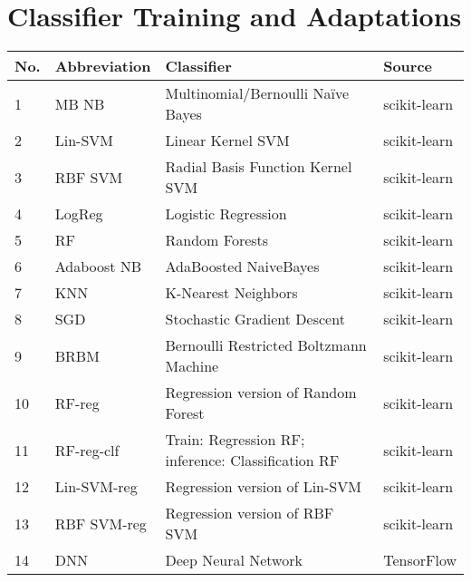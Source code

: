 \chapter{Classifier Training and Adaptations}\label{sec:ml}


\begin{table}[t]
    \centering
    \begin{tabular}{|l|l|l|l|}
    \hline\hline
    \textsf{No.}& \textsf{Abbreviation} & \textsf{Classifier} & \textsf{Source}\\
   
    \hline
    1 & \textsf{MB NB} & \textsf{Multinomial/Bernoulli Na\"{i}ve Bayes} & \textsf{scikit-learn} \\
    2 & \textsf{Lin-SVM}& \textsf{Linear Kernel SVM} & \textsf{scikit-learn} \\
    3 & \textsf{RBF SVM}& \textsf{Radial Basis Function Kernel SVM} & \textsf{scikit-learn} \\
    4 & \textsf{LogReg} & \textsf{Logistic Regression} & \textsf{scikit-learn}\\
    5 & \textsf{RF} & \textsf{Random Forests} & \textsf{scikit-learn} \\
    6 &  \textsf{Adaboost NB}& \textsf{AdaBoosted NaiveBayes}& \textsf{scikit-learn} \\
    7 &  \textsf{KNN} & \textsf{K-Nearest Neighbors}& \textsf{scikit-learn} \\
    8 & \textsf{SGD} & \textsf{Stochastic Gradient Descent}& \textsf{scikit-learn} \\
    9 & \textsf{BRBM} & \textsf{Bernoulli Restricted Boltzmann Machine} & \textsf{scikit-learn}\\
    10 & \textsf{RF-reg} & \textsf{Regression version of Random Forest}& \textsf{scikit-learn}\\
    11 & \textsf{RF-reg-clf} & \textsf{Train: Regression RF; inference: Classification RF}& \textsf{scikit-learn}\\
    12 & \textsf{Lin-SVM-reg} & \textsf{Regression version of Lin-SVM}& \textsf{scikit-learn}\\
    13 & \textsf{RBF SVM-reg} & \textsf{Regression version of RBF SVM}& \textsf{scikit-learn}\\
    \hline
    14 & \textsf{DNN} & \textsf{Deep Neural Network}& \textsf{TensorFlow} \\

\end{tabular}
\end{table}
